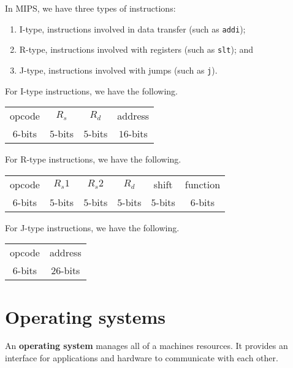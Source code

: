 \begin{example}
    In MIPS, we have three types of instructions:
    \begin{enumerate}
        \item I-type, instructions involved in data transfer (such as \texttt{addi});
        \item R-type, instructions involved with registers (such as \texttt{slt}); and
        \item J-type, instructions involved with jumps (such as \texttt{j}).
    \end{enumerate}
    For I-type instructions, we have the following.
    \begin{center}
        \begin{tabular}{cccc}
            opcode & $R_s$ & $R_d$ & address \\
            $6$-bits & $5$-bits & $5$-bits & $16$-bits \\
        \end{tabular}
    \end{center}
    For R-type instructions, we have the following.
    \begin{center}
        \begin{tabular}{cccccc}
            opcode & $R_s1$ & $R_s2$ & $R_d$ & shift & function \\
            $6$-bits & $5$-bits & $5$-bits & $5$-bits & $5$-bits & $6$-bits \\
        \end{tabular}
    \end{center}
    For J-type instructions, we have the following.
    \begin{center}
        \begin{tabular}{cc}
            opcode & address \\
            $6$-bits & $26$-bits
        \end{tabular}
    \end{center}
\end{example}

\section{Operating systems}

\begin{definition}
    An \textbf{operating system} manages all of a machines resources. It provides an interface for applications and hardware to communicate with each other.
\end{definition}

